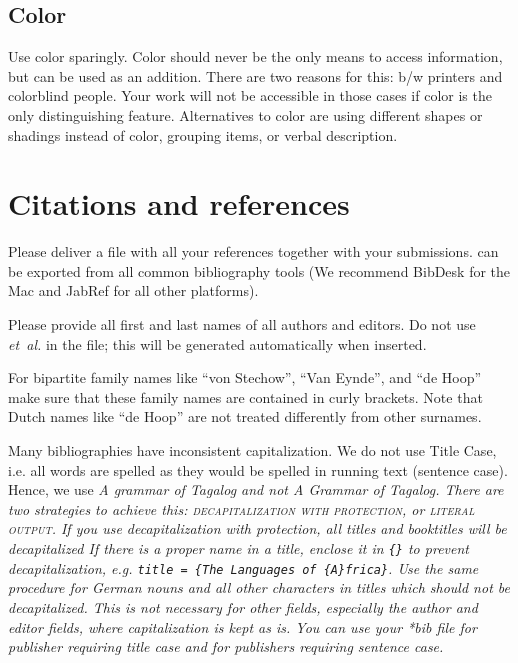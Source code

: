 {\subsection{Color}
Use color sparingly. Color should never be the only means to access information, but can be used as an addition. There are two reasons for this: b/w printers and colorblind people. Your work will not be accessible in those cases if color is the only distinguishing feature. Alternatives to color are using different shapes or shadings instead of color, grouping items, or verbal description. 




\section{Citations and references}
\label{sec-references-authors}

Please deliver a \bibtex file with all your references together with your submissions. 
\bibtex can be exported from all common bibliography tools (We recommend BibDesk for the Mac and JabRef for all other platforms). 

Please provide all first and last names of all authors and editors. Do not use {\em et~al.}  in the \bibtex file; this will be generated automatically when inserted.

For bipartite family names like ``von Stechow'', ``Van Eynde'', and ``de Hoop'' make sure that these
family names are contained in curly brackets.
 Note that Dutch names like ``de Hoop'' are not treated differently from other surnames.

Many bibliographies have inconsistent capitalization. We do not use Title Case, i.e. all words are spelled as they would be spelled in running text (sentence case). Hence, we use \em A grammar of Tagalog \em and not \em A Grammar of Tagalog\em. There are two strategies to achieve this: \textsc{decapitalization with protection}, or \textsc{literal output}. If you use decapitalization with protection, all titles and booktitles will be decapitalized  If there is a proper name in a title, enclose it in \verb+{}+ to prevent decapitalization, e.g. \verb+title = {The Languages of {A}frica}+. Use the same procedure for German nouns and all other characters in titles which should not be decapitalized. This is not necessary for other fields, especially the author and editor fields, where capitalization is kept as is. You can use your *bib file for publisher requiring title case and for publishers requiring sentence case.

}
